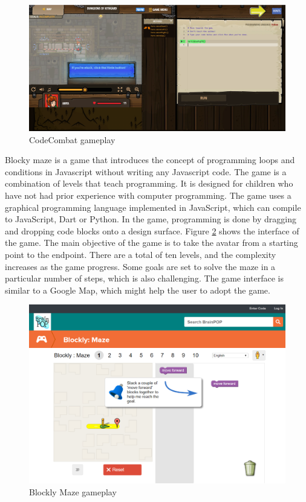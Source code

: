 \begin{figure}[ht!]
	\includegraphics[width=\columnwidth]{images/CodeCombat.PNG}
    \caption{CodeCombat gameplay}
    \label{fig:CodeCombat}
\end{figure}

Blocky maze \cite{Blocklymaze} is a game that introduces the concept of programming loops and conditions in Javascript without writing any Javascript code. The game is a combination of levels that teach programming. It is designed for children who have not had prior experience with computer programming. The game uses a graphical programming language implemented in JavaScript, which can compile to JavaScript, Dart or Python. In the game, programming is done by dragging and dropping code blocks onto a design surface. Figure \ref{fig:BlocklyMaze} shows the interface of the game. The main objective of the game is to take the avatar from a starting point to the endpoint. There are a total of ten levels, and the complexity increases as the game progress. Some goals are set to solve the maze in a particular number of steps, which is also challenging. The game interface is similar to a Google Map, which might help the user to adopt the game. 

\begin{figure}[ht!]
	\includegraphics[width=\columnwidth]{images/BlocklyMaze.PNG}
    \caption{Blockly Maze gameplay}
    \label{fig:BlocklyMaze}
\end{figure}

